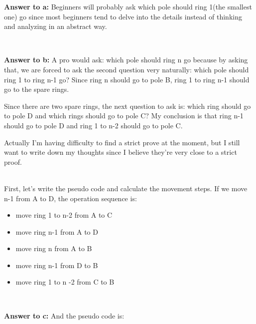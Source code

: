 \documentclass[a4paper,11pt]{article}
\theoremstyle{mytheor}
\begin{document}
\textbf{Answer to a:} Beginners will probably ask which pole should ring 1(the smallest one) go since most beginners tend to delve into the details instead of thinking and analyzing in an abstract way.

~\\
\vspace{1.2in}


\noindent\textbf{Answer to b:} A pro would ask: which pole should ring n go because by asking that, we are forced to ask the second question very naturally: which pole should ring 1 to ring n-1 go? Since ring n should go to pole B, ring 1 to ring n-1 should go to the spare rings.

Since there are two spare rings, the next question to ask is: which ring should go to pole D and which rings should go to pole C?
My conclusion is that ring n-1 should go to pole D and ring 1 to n-2 should go to pole C. 

Actually I'm having difficulty to find a strict prove at the moment, but I still want to write down my thoughts since I believe they're very close to a strict proof.

~\\
First, let's write the pseudo code and calculate the movement steps. If we move n-1 from A to D, the operation sequence is:
\begin{itemize}
    \item move ring 1 to n-2 from A to C
    \item move ring n-1 from A to D
    \item move ring n from A to B
    \item move ring n-1 from D to B
    \item move ring 1 to n -2 from C to B
\end{itemize}

~\\
\vspace{1.2in}

\noindent\textbf{Answer to c:} And the pseudo code is:
\iffalse
\begin{lstlisting}[label={list:fourth},caption=steps listing -- Towers of Hanoi with four poles.]
ToH4Poles(n, A, B, C, D)
    if n == 1:
      move ring 1 from A to B
    elseif n == 2:
      move ring 1 from A to D
      move ring 2 from A to B
      move ring 1 from D to B
    else:
      ToH4Poles(n-2, A, C, B, D);
      move ring n-1 from A to D
      move ring n from A to B
      move ring n-1 from D to B
      ToH4Poles(n-2, C, B, A, D);
\end{lstlisting}
\fi
\end{document}

